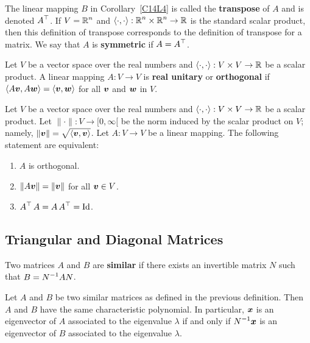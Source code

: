 \begin{defn}
The linear mapping $B$ in Corollary~\ref{C14L4} is called the
{\bfseries transpose} of $A$ and is
denoted $\displaystyle A^\top$.  If $\displaystyle V=\mathbb{R}^n$ and
$\displaystyle \left\langle{\cdot} , {\cdot}\right\rangle : \mathbb{R}^n \times \mathbb{R}^n \to \mathbb{R}$
is the standard scalar product, then this definition of transpose
corresponds to the definition of transpose for a matrix.  We say that
$A$ is {\bfseries symmetric} if
$\displaystyle A = A^\top$.
\end{defn}

\begin{defn}
Let $V$ be a vector space over the real numbers and
$\left\langle{\cdot} , {\cdot}\right\rangle:V \times V \rightarrow \mathbb{R}$ be a scalar product.
A linear mapping $A: V \rightarrow V$ is
{\bfseries real unitary} or
{\bfseries orthogonal} if
$\left\langle{A\bm{v}} , {A\bm{w}}\right\rangle = \left\langle{\bm{v}} , {\bm{w}}\right\rangle$ for all $\bm{v}$ and
$\bm{w}$ in $V$.
\end{defn}

\begin{theorem}
Let $V$ be a vector space over the real numbers and
$\left\langle{\cdot} , {\cdot}\right\rangle:V \times V \rightarrow \mathbb{R}$ be a scalar product.
Let $\|\cdot\|:V \rightarrow [0,\infty[$ be the norm induced by the scalar
product on $V$; namely, $\|\bm{v}\| = \sqrt{\left\langle{\bm{v}} , {\bm{v}}\right\rangle}$.  Let
$A:V \rightarrow V$ be a linear mapping.  The following statement are
equivalent:
\begin{enumerate}
\item $A$ is orthogonal.
\item $\| A\bm{v} \| =  \|\bm{v}\|$ for all $\bm{v} \in V$.
\item $\displaystyle A^\top\,A = A\,A^\top = \operatorname{Id}$.
\end{enumerate}
\end{theorem}

\subsection{Triangular and Diagonal Matrices}

\begin{defn}
Two \nn matrices $A$ and $B$ are
{\bfseries similar} if there exists an
invertible \nn matrix $N$ such that $\displaystyle B = N^{-1} A N$.
\end{defn}

\begin{theorem}
Let $A$ and $B$ be two similar \nn matrices as defined in the
previous definition.  Then $A$ and $B$ have the
same characteristic polynomial.  In particular, $\bm{x}$ is an eigenvector
of $A$ associated to the eigenvalue $\lambda$ if and only if
$\displaystyle N^{-1}\bm{x}$
is an eigenvector of $B$ associated to the eigenvalue $\lambda$.
\end{theorem}

